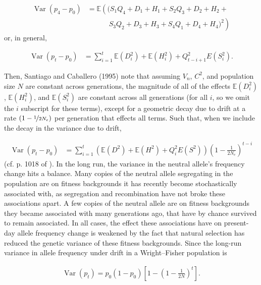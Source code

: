 \documentclass[11pt]{article}
\newcommand{\E}{\mathbb{E}}
\DeclareMathOperator{\var}{Var}
\DeclareMathOperator{\cov}{Cov}
\begin{document}
\begin{align}
  \var(p_4 - p_0) &= \E \left( \bigg(  S_1 Q_4 + D_1 + H_1 + S_2 Q_3 + D_2 + H_2 + \right. \nonumber \\
                  & \;\;\;\;\;\;\;\;\;\;\; \left. S_3 Q_2 + D_3 + H_3 + S_4 Q_1 + D_4 + H_4 \bigg)^2 \right)
\end{align}
%
or, in general,

\begin{align}
    \var(p_t - p_0) &= \sum_{i=1}^t \E(D_i^2) + \E(H_i^2) + Q_{t-i+1}^2 E(S_i^2).
\end{align}

Then, Santiago and Caballero (1995) note that assuming $V_n$, $C^2$, and
population size $N$ are constant across generations, the magnitude of all of
the effects $\E(D_i^2)$, $\E(H_i^2)$, and $\E(S_i^2)$ are constant across all
generations (for all $i$, so we omit the $i$ subscript for these terms), except
for a geometric decay due to drift at a rate $(1-\nicefrac{1}{2N_e})$ per
generation that effects all terms. Such that, when we include the decay in the
variance due to drift,

\begin{align}
  \var(p_t - p_0) &= \sum_{i=1}^t \left(\E(D^2) + \E(H^2) + Q_{i}^2 E(S^2) \right) \left( 1 - \frac{1}{2N_e} \right)^{t-i}
  \label{eq:var-sc}
\end{align}
%
(cf. p. 1018 of \cite{Santiago1995-hx}). In the long run, the variance in the
neutral allele's frequency change hits a balance. Many copies of the neutral
allele segregating in the population are on fitness backgrounds it has recently
become stochastically associated with, as segregation and recombination have
not broke these associations apart. A few copies of the neutral allele are on
fitness backgrounds they became associated with many generations ago, that have
by chance survived to remain associated. In all cases, the effect these
associations have on present-day allele frequency change is weakened by the
fact that natural selection has reduced the genetic variance of these fitness
backgrounds. Since the long-run variance in allele frequency under drift in a
Wright--Fisher population is

\begin{align}
  \var(p_t) = p_0(1-p_0) \left[1 - \left(1 - \frac{1}{2N}\right)^t \right].
  \label{eq:sc-Ne}
\end{align}
\end{document}
